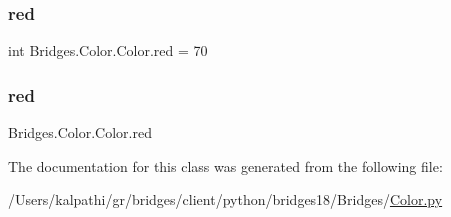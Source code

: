 \subsubsection{\texorpdfstring{red}{red}\hspace{0.1cm}{\footnotesize\ttfamily [1/2]}}
{\footnotesize\ttfamily int Bridges.\+Color.\+Color.\+red = 70\hspace{0.3cm}{\ttfamily [static]}}

\mbox{\label{class_bridges_1_1_color_1_1_color_a51436cc5661d40acb09332e7bc9a13b7}} 
\subsubsection{\texorpdfstring{red}{red}\hspace{0.1cm}{\footnotesize\ttfamily [2/2]}}
{\footnotesize\ttfamily Bridges.\+Color.\+Color.\+red}



The documentation for this class was generated from the following file\+:\begin{DoxyCompactItemize}
\item 
/\+Users/kalpathi/gr/bridges/client/python/bridges18/\+Bridges/\mbox{\hyperlink{_color_8py}{Color.\+py}}\end{DoxyCompactItemize}

